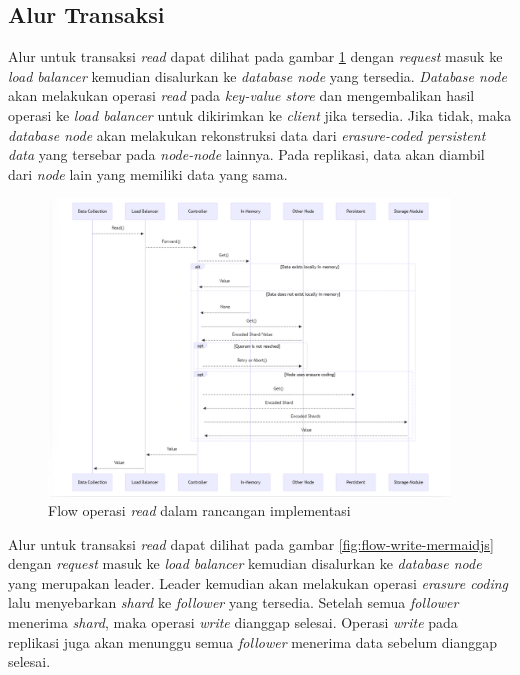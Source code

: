 \subsection{Alur Transaksi}
\label{subsection:system-flow}

Alur untuk transaksi \textit{read} dapat dilihat pada gambar \ref{fig:flow-read-mermaidjs} dengan \textit{request} masuk ke \textit{load balancer} kemudian disalurkan ke \textit{database node} yang tersedia. \textit{Database node} akan melakukan operasi \textit{read} pada \textit{key-value store} dan mengembalikan hasil operasi ke \textit{load balancer} untuk dikirimkan ke \textit{client} jika tersedia. Jika tidak, maka \textit{database node} akan melakukan rekonstruksi data dari \textit{erasure-coded persistent data} yang tersebar pada \textit{node-node} lainnya. Pada replikasi, data akan diambil dari \textit{node} lain yang memiliki data yang sama.

\begin{figure}[!ht]
    \centering
    \includegraphics[width=0.95\textwidth]{resources/chapter-3/flow-read-mermaidjs.png}
    \caption{Flow operasi \textit{read} dalam rancangan implementasi}
    \label{fig:flow-read-mermaidjs}
\end{figure}

Alur untuk transaksi \textit{read} dapat dilihat pada gambar \ref{fig:flow-write-mermaidjs} dengan \textit{request} masuk ke \textit{load balancer} kemudian disalurkan ke \textit{database node} yang merupakan leader. Leader kemudian akan melakukan operasi \textit{erasure coding} lalu menyebarkan \textit{shard} ke \textit{follower} yang tersedia. Setelah semua \textit{follower} menerima \textit{shard}, maka operasi \textit{write} dianggap selesai. Operasi \textit{write} pada replikasi juga akan menunggu semua \textit{follower} menerima data sebelum dianggap selesai. 

